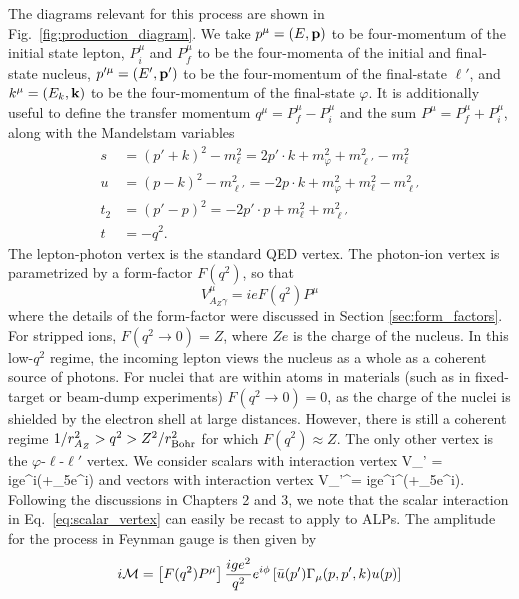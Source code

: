 The diagrams relevant for this process are shown in Fig.~\ref{fig:production_diagram}. We take $p^\mu = (E, {\bf p})$ to be four-momentum of the initial state lepton, $P_i^\mu$ and $P_f^\mu$ to be the four-momenta of the initial and final-state nucleus, $p'^\mu = (E', {\bf p}')$ to be the four-momentum of the final-state $\ell'$, and $k^\mu = (E_k, {\bf k})$ to be the four-momentum of the final-state $\varphi$. It is additionally useful to define the transfer momentum $q^\mu = P_f^\mu - P_i^\mu$ and the sum $P^\mu = P_f^\mu + P_i^\mu$, along with the Mandelstam variables
\begin{align}
    s &= (p'+k)^2 - m_\ell^2 = 2p'\cdot k + m_\varphi^2 + m_{\ell'}^2 - m_\ell^2 \\
    u &= (p-k)^2 - m_{\ell'}^2 = -2p\cdot k + m_\varphi^2 + m_\ell^2  - m_{\ell'}^2\\
    t_2 &= (p' - p)^2 = -2p'\cdot p + m_\ell^2 + m_{\ell'}^2 \\
    t &= -q^2.
\end{align}
The lepton-photon vertex is the standard QED vertex. The photon-ion vertex is parametrized by a form-factor $F(q^2)$, so that 
\begin{equation}
    V^\mu_{A_Z\gamma} = ieF(q^2) P^\mu
\end{equation}
where the details of the form-factor were discussed in Section \ref{sec:form_factors}. For stripped ions, $F(q^2 \rightarrow 0) = Z$, where $Ze$ is the charge of the nucleus. In this low-$q^2$ regime, the incoming lepton views the nucleus as a whole as a coherent source of photons. For nuclei that are within atoms in materials (such as in fixed-target or beam-dump experiments) $F(q^2\rightarrow 0) = 0$, as the charge of the nuclei is shielded by the electron shell at large distances. However, there is still a coherent regime $1/r_{A_Z}^2 > q^2 > Z^2/r_{\rm Bohr}^2$ for which $F(q^2) \approx Z$. The only other vertex is the $\varphi$-$\ell$-$\ell'$ vertex. We consider  scalars with interaction vertex
\beq
    V_{\varphi \ell \ell'} = ige^{i\phi}(\cos{\theta}+\gamma_5e^{i\delta}\sin{\theta})\label{eq:scalar_vertex}
\eeq
and vectors with interaction vertex
\beq
    V_{\varphi \ell \ell'}^\mu = ige^{i\phi}\gamma^\mu(\cos{\theta}+\gamma_5e^{i\delta}\sin{\theta}).\label{eq:vector_vertex}
\eeq
Following the discussions in Chapters 2 and 3, we note that the scalar interaction in Eq.~\ref{eq:scalar_vertex} can easily be recast to apply to ALPs. The amplitude for the process in Feynman gauge is then given by
\begin{equation}
    i{\cal M} = \left[F(q^2)P^\mu\right]\frac{ige^2}{q^2}e^{i\phi}\left[\bar{u}(p')\Gamma_\mu(p, p', k)u(p)\right]
\end{equation}
